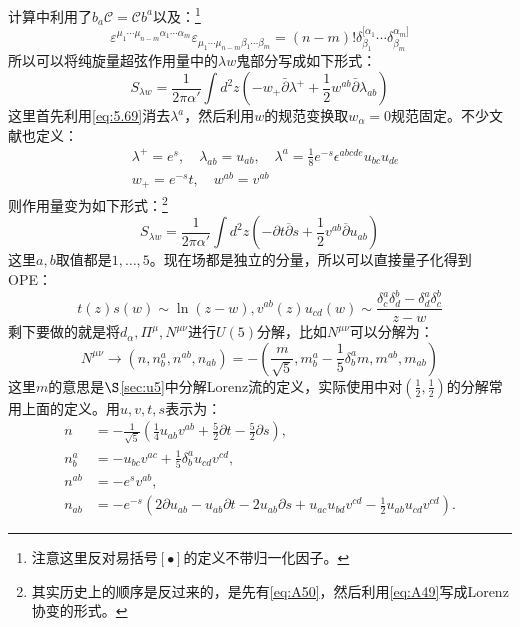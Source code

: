计算中利用了$b_a\mathcal{C}=\mathcal{C}b^a$以及：\cite{ZSDZ201905004}\footnote{注意这里反对易括号$[\bullet]$的定义不带归一化因子。}
\begin{equation}
	\varepsilon^{\mu_{1}\cdots\mu_{n-m}\alpha_{1}\cdots\alpha_{m}}\varepsilon_{\mu_{1}\cdots\mu_{n-m}\beta_{1}\cdots\beta_{m}}=(n-m)!\delta_{\beta_{1}}^{[\alpha_{1}}\cdots\delta_{\beta_{m}}^{\alpha_{m}]}
\end{equation}
所以可以将纯旋量超弦作用量中的$\lambda w$鬼部分写成如下形式：
\begin{equation}
	S_{\lambda w}=\frac{1}{2\pi\alpha'}\int d^2z(-w_+\bar{\partial}\lambda^++\frac{1}{2}w^{ab}\bar{\partial}\lambda_{ab})
\end{equation}
这里首先利用\ref{eq:5.69}消去$\lambda^a$，然后利用$w$的规范变换取$w_\alpha = 0$规范固定。不少文献也定义：
\begin{equation}
	\label{eq:A49}
\begin{aligned}
		&\lambda^+=e^s,\quad\lambda_{ab}=u_{ab},\quad\lambda^a=\frac{1}{8}e^{-s}\epsilon^{abcde}u_{bc}u_{de}\\
	&w_+= e^{-s}t,\quad w^{ab} = v^{ab}
\end{aligned}
\end{equation}
则作用量变为如下形式：\footnote{其实历史上的顺序是反过来的，是先有\ref{eq:A50}，然后利用\ref{eq:A49}写成Lorenz协变的形式。}
\begin{equation}
	\label{eq:A50}
	S_{\lambda w}=\frac{1}{2\pi \alpha'}\int d^2z\left(-\partial t\overline{\partial}s+\frac{1}{2}v^{ab}\overline{\partial}u_{ab}\right)
\end{equation}
这里$a,b$取值都是$1,\ldots,5$。现在场都是独立的分量，所以可以直接量子化得到OPE：
\begin{equation}
	t(z)s(w)\sim\ln\left(z-w\right),v^{ab}(z)u_{cd}(w)\sim\frac{\delta_c^a\delta_d^b-\delta_d^a\delta_c^b}{z-w}
\end{equation}
剩下要做的就是将$d_\alpha,\Pi^\mu,N^{\mu\nu}$进行$U(5)$分解，比如$N^{\mu\nu}$可以分解为：
\begin{equation}
	N^{\mu\nu}\to (n,n_b^a,n^{ab},n_{ab})=-\left(\frac{m}{\sqrt{5}},m_b^a-\frac{1}{5}\delta_b^am,m^{ab},m_{ab}\right)
\end{equation}
这里$m$的意思是$\S$\ref{sec:u5}中分解Lorenz流的定义，实际使用中对$(\frac12,\frac12)$的分解常用上面的定义\cite{Berkovits:2001us,Hoogeveen:2009hk}。用$u,v,t,s$表示为：
\begin{equation}
	\begin{aligned}
		n&=-\frac{1}{\sqrt{5}}\left(\frac{1}{4}u_{ab}v^{ab}+\frac{5}{2}\partial t-\frac{5}{2}\partial s\right),\\n_b^a&=-u_{bc}v^{ac}+\frac{1}{5}\delta_b^au_{cd}v^{cd},\\n^{ab}&=-e^sv^{ab},\\n_{ab}&=-e^{-s}\left(2\partial u_{ab}-u_{ab}\partial t-2u_{ab}\partial s+u_{ac}u_{bd}v^{cd}-\frac{1}{2}u_{ab}u_{cd}v^{cd}\right).
	\end{aligned}
\end{equation}
